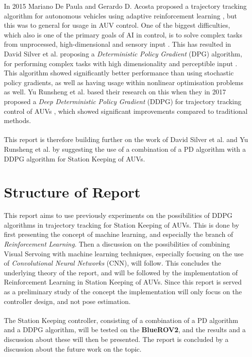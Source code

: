 In 2015 Mariano De Paula and Gerardo D. Acosta proposed a trajectory tracking algorithm for autonomous vehicles using adaptive reinforcement learning \cite{Paula}, but this was to general for usage in AUV control. One of the biggest difficulties, which also is one of the primary goals of AI in control, is to solve complex tasks from unprocessed, high-dimensional and sensory input \cite{Lillicrap}. This has resulted in David Silver et al. proposing a \textit{Deterministic Policy Gradient} (DPG) algorithm, for performing complex tasks with high dimensionality and perceptible input \cite{David}. This algorithm showed significantly better performance than using stochastic policy gradients, as well as having usage within nonlinear optimisation problems as well. Yu Runsheng et al. based their research on this when they in 2017 proposed a \textit{Deep Deterministic Policy Gradient} (DDPG) for trajectory tracking control of AUVs \cite{Yu}, which showed significant improvements compared to traditional methods.\\\\
This report is therefore building further on the work of David Silver et al. and Yu Runsheng et al. by suggesting the use of a combination of a PD algorithm with a DDPG algorithm for Station Keeping of AUVs.   
\section{Structure of Report}
This report aims to use previously experiments on the possibilities of DDPG algorithms in trajectory tracking for Station Keeping of AUVs. This is done by first presenting the concept of machine learning, and especially the branch of \textit{Reinforcement Learning}. Then a discussion on the possibilities of combining Visual Servoing with machine learning techniques, especially focusing on the use of \textit{Convolutional Neural Networks} (CNN), will follow. This concludes the underlying theory of the report, and will be followed by the implementation of Reinforcement Learning in Station Keeping of AUVs. Since this report is served as a preliminary study of the concept the implementation will only focus on the controller design, and not pose estimation.\\\\
The Station Keeping controller, consisting of a combination of a PD algorithm and a DDPG algorithm, will be tested on the \textbf{BlueROV2}, and the results and a discussion about these will then be presented. The report is concluded by a discussion about the future work on the topic. 
